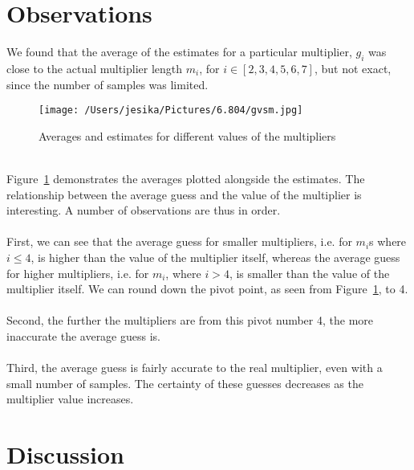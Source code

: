 \documentclass[12pt]{article}
\begin{document}
\section{Observations}\label{observations}
We found that the average of the estimates for a particular multiplier, $g_i$ was close to the actual multiplier length $m_i$, for $i \in [2,3,4,5,6,7]$, but not exact, since the number of samples was limited.
\begin{figure}[!ht]
  \centering
    \texttt{[image: /Users/jesika/Pictures/6.804/gvsm.jpg]}
  \caption{Averages and estimates for different values of the multipliers}
  \label{gvsm}
\end{figure}
\\Figure~\ref{gvsm} demonstrates the averages plotted alongside the estimates. 
The relationship between the average guess and the value of the multiplier is interesting. A number of observations are thus in order. 
\\\\First, we can see that the average guess for smaller multipliers, i.e. for $m_i$s where $i \leq 4$, is higher than the value of the multiplier itself, whereas the average guess for higher multipliers, i.e. for $m_i$, where $i > 4$, is smaller than the value of the multiplier itself. We can round down the pivot point, as seen from Figure~\ref{gvsm}, to 4. 
\\\\Second, the further the multipliers are from this pivot number 4, the more inaccurate the average guess is. 
\\\\Third, the average guess is fairly accurate to the real multiplier, even with a small number of samples. The certainty of these guesses decreases as the multiplier value increases. 
\section{Discussion}\label{discussion}
\end{document}
